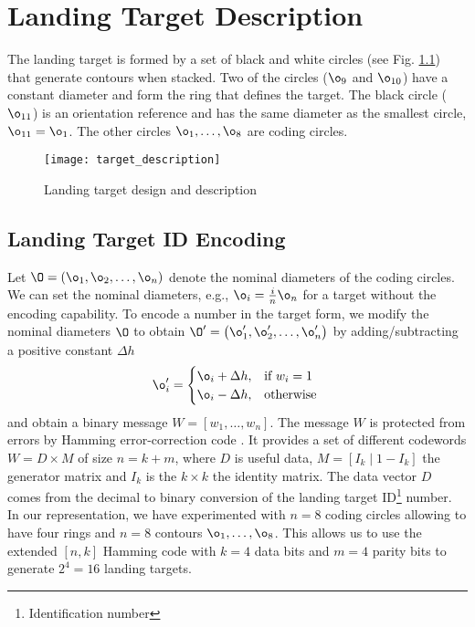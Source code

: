 
\chapter{Landing Target Description}\label{ch:target_description}
The landing target is formed by a set of black and white circles (see Fig. \ref{fig:target_description}) that generate contours when stacked. Two of the circles ($\o_{9}$ and $\o_{10}$) have a constant diameter and form the ring that defines the target. The black circle ($\o_{11}$) is an orientation reference and has the same diameter as the smallest circle, $\o_{11}=\o_{1}$. The other circles $\o_{1}, \ldots, \o_{8}$ are coding circles.

\begin{figure}[h!]
\centering
\texttt{[image: target\_description]}
\caption{Landing target design and description}
\label{fig:target_description}
\end{figure}

\section{Landing Target ID Encoding}
Let $\O=\left( \o_{1}, \o_{2},\ldots,\o_{n}\right) $ denote the nominal diameters of the coding circles. We can set the nominal diameters, e.g., $\o_{i}=\frac{i}{n}\o_{n}$ for a target without the encoding capability. To encode a number in the target form, we modify the nominal diameters $\O$ to obtain $\O'=\left( \o_{1}', \o_{2}',\ldots,\o_{n}'\right) $ by adding/subtracting a positive constant $\Delta h$
\begin{equation}
\o_{i}'=
\begin{cases}
  \o_{i}+\Delta h, & \text{if } w_{i}=1 \\
  \o_{i}- \Delta h, & \text{otherwise }
\end{cases}
\end{equation}
and obtain a binary message  $W=[w_{1}, \dots,w_{n}]$. The message $W$ is protected from errors by Hamming error-correction code \cite{Hamming:BSTJ:1950}. It provides a set of different codewords $W= D\times M$ of size $n=k+m$, where $D$ is useful data, $ M=[I_{k}\mid 1-I_{k}]$ the generator matrix and $I_{k}$ is the $k\times k$ the identity matrix. The data vector $D$ comes from the decimal to binary conversion of the landing target ID\footnote[1]{Identification number} number. In our representation, we have experimented with $n=8$ coding circles allowing to have four rings and $n=8$ contours $\o_{1}, \ldots, \o_{8}$. This allows us to use the extended $[n,k]$ Hamming code with $k=4$ data bits and $m=4$ parity bits to generate $2^{4}=16$ landing targets.

